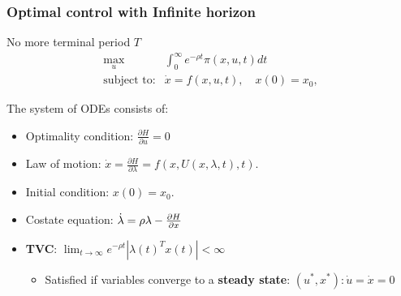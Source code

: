 \documentclass[bigger,handout]{beamer}
\newenvironment{stepitemize}{\begin{itemize}[<+->]}{\end{itemize} }
\begin{document}
 
 
\begin{frame}%
 
\frametitle{Optimal control with Infinite horizon }

No more terminal period $T$ 
\begin{equation*}
\begin{array}{rl}
\max_{u} & \int_{0}^{\mathbf{\infty }}e^{-\rho t}\pi (x,u,t)dt \\ 
\text{subject to:} & \dot{x}=f(x,u,t),\quad x(0)=x_{0},%
\end{array}%
\end{equation*}

The system of ODEs consists of:

\begin{stepitemize}
\item Optimality condition: $\frac{\partial H}{\partial u}=0$

\item Law of motion: $\dot{x}=\frac{\partial H}{\partial \lambda }%
=f(x,U(x,\lambda ,t),t)$.

\item Initial condition: $x(0)=x_{0}.$

\item Costate equation: $\dot{\lambda}=\rho \lambda -\frac{\partial H}{%
\partial x}$

\item \textbf{TVC}: $\lim_{t\rightarrow \infty }e^{-\rho t}|\lambda
(t)^{T }x(t)|<\infty $

\begin{itemize}
\item Satisfied if variables converge to a \textbf{steady state}: \newline
$\left( u^{\ast },x^{\ast }\right) :\dot{u}=\dot{x}=0$
\end{itemize}
\end{stepitemize}

 
 
\end{frame}%
 
 
 
\end{document}
